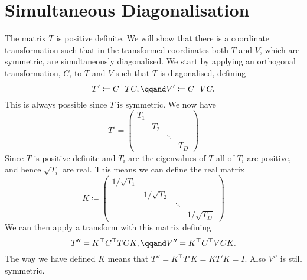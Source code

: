 \documentclass[fleqn]{NotesClass}
\newcommand*{\ident}{I}
\newcommand*{\trans}{\top}
\begin{document}
    \section{Simultaneous Diagonalisation}
    The matrix \(T\) is positive definite.
    We will show that there is a coordinate transformation such that in the transformed coordinates both \(T\) and \(V\), which are symmetric, are simultaneously diagonalised.
    We start by applying an orthogonal transformation, \(C\), to \(T\) and \(V\) such that \(T\) is diagonalised, defining
    \begin{equation}
        T' \coloneqq C^{\trans}TC, \qqand V' \coloneqq C^{\trans}VC.
    \end{equation}
    This is always possible since \(T\) is symmetric.
    We now have
    \begin{equation}
        T' = 
        \begin{pmatrix}
            T_1 &     &        & \\
                & T_2 &        & \\
                &     & \ddots & \\
                &     &        & T_D
        \end{pmatrix}
    \end{equation}
    Since \(T\) is positive definite and \(T_i\) are the eigenvalues of \(T\) all of \(T_i\) are positive, and hence \(\sqrt{T_i}\) are real.
    This means we can define the real matrix
    \begin{equation}
        K \coloneqq 
        \begin{pmatrix}
            1/\sqrt{T_1} &              &        & \\
                         & 1/\sqrt{T_2} &        & \\
                         &              & \ddots & \\
                         &              &        & 1/\sqrt{T_D}
        \end{pmatrix}
    \end{equation}
    We can then apply a transform with this matrix defining
    \begin{equation}
        T'' = K^\trans C^\trans TCK, \qqand V'' = K^{\trans}C^{\trans}VCK.
    \end{equation}
    The way we have defined \(K\) means that \(T'' = K^{\trans}T'K = KT'K = \ident\).
    Also \(V''\) is still symmetric.
    
\end{document}
